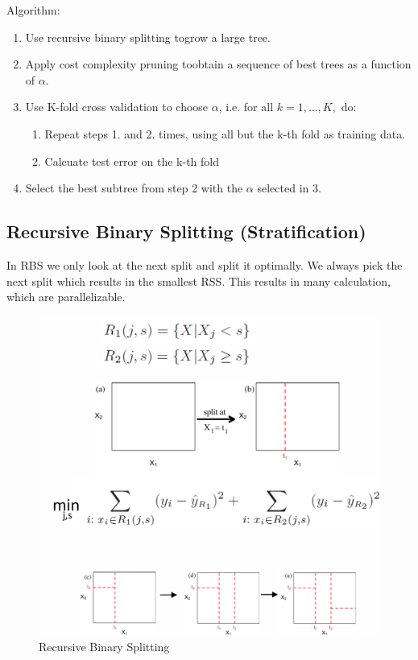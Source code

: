 \documentclass[../Main.tex]{subfiles}
\begin{document}
Algorithm:
\begin{enumerate}
    \item Use recursive binary splitting togrow a large tree.
    \item Apply cost complexity pruning toobtain a sequence of best trees as a function of \(\alpha\).
    \item Use K-fold cross validation to choose \(\alpha\), i.e. for all \(k=1,\dots,K,\) do:
    \begin{enumerate}
        \item Repeat steps 1. and 2. times, using all but the k-th fold as training data.
        \item Calcuate test error on the k-th fold
    \end{enumerate}
    \item Select the best subtree from step 2 with the \(\alpha\) selected in 3.
\end{enumerate}

\subsection{Recursive Binary Splitting (Stratification)}


In RBS we only look at the next split and split it optimally.
We always pick the next split which results in the smallest RSS.
This results in many calculation, which are parallelizable.
\begin{figure}[H]
    \centering
    \includegraphics[width=0.75\linewidth]{Images/recursive-binary-splitting.png}
    \caption{Recursive Binary Splitting}
\end{figure}
\end{document}
